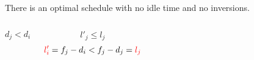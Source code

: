 \begin{frame}{}
  \begin{theorem}
    There is an optimal schedule with no idle time and no inversions.
  \end{theorem}

  \pause
  \vspace{0.50cm}
  \begin{quote}
    \centering
  \end{quote}

  \pause
  \vspace{0.50cm}
  \begin{columns}
      \pause
      \[
	d_j < d_i
      \]

      \pause
      \[
	l'_j \le l_j
      \]
      \pause
      \[
	\textcolor{red}{l'_i} = f_j - d_i < f_j - d_j = \textcolor{red}{l_j}
      \]
  \end{columns}
\end{frame}
